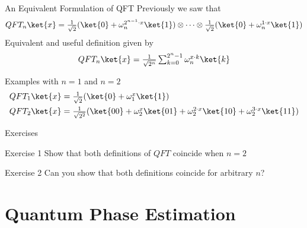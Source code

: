 \documentclass{beamer}
\begin{document}
\begin{frame}{An Equivalent Formulation of QFT}
        Previously we saw that
        \[
                QFT_n \ket{x} = \textstyle{
                        \frac{1}{\sqrt{2}} (\ket{0} + \omega_{n}^{2^{n - 1} \cdot x}\ket{1})
                        \otimes \dots \otimes
                        \frac{1}{\sqrt{2}} (\ket{0} + \omega_{n}^{1 \cdot x}\ket{1})
                }
        \]
        \pause
        Equivalent and useful definition given by
        \[
                QFT_n \ket{x} = \textstyle{
                        \frac{1}{\sqrt{2^n}} 
                        \sum_{k = 0}^{2^n - 1}  \omega_n^{x \cdot k} \ket{k}
                }
        \]
        \pause
        \begin{block}{Examples with $n=1$ and $n = 2$}
                \begin{align*}
                        QFT_1 \ket{x} & = \textstyle{
                                \frac{1}{\sqrt{2}} (\ket{0} + \omega_1^{x} \ket{1})
                        }
                        \\
                        QFT_2 \ket{x} & = \textstyle{
                                \frac{1}{\sqrt{2^2}}
                                (\ket{00} + \omega_2^x \ket{01} 
                                + \omega_2^{2 \cdot x} \ket{10} +
                                \omega_2^{3 \cdot x}\ket{11})
                        }
                \end{align*}
        \end{block}
\end{frame}

\begin{frame}{Exercises}
        \begin{block}{Exercise 1}
                Show that both definitions of $QFT$ coincide
                when $n = 2$
        \end{block}

        \begin{block}{Exercise 2}
                Can you show that both definitions coincide
                for arbitrary $n$?
        \end{block}
\end{frame}

\section{Quantum Phase Estimation}
\end{document}
